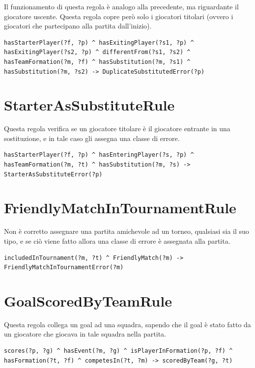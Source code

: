 \documentclass[11pt]{report} %
\begin{document}
Il funzionamento di questa regola è analogo alla precedente, ma riguardante il giocatore uscente.
Questa regola copre però solo i giocatori titolari (ovvero i giocatori che partecipano alla partita dall'inizio).

\begin{lstlisting}[language=SWRL]
hasStarterPlayer(?f, ?p) ^ hasExitingPlayer(?s1, ?p) ^ hasExitingPlayer(?s2, ?p) ^ differentFrom(?s1, ?s2) ^ hasTeamFormation(?m, ?f) ^ hasSubstitution(?m, ?s1) ^ hasSubstitution(?m, ?s2) -> DuplicateSubstitutedError(?p)
\end{lstlisting}

\section{StarterAsSubstituteRule}

Questa regola verifica se un giocatore titolare è il giocatore entrante in una sostituzione, e in tale caso gli assegna una classe di errore.

\begin{lstlisting}[language=SWRL]
hasStarterPlayer(?f, ?p) ^ hasEnteringPlayer(?s, ?p) ^ hasTeamFormation(?m, ?t) ^ hasSubstitution(?m, ?s) -> StarterAsSubstituteError(?p)
\end{lstlisting}

\section{FriendlyMatchInTournamentRule}

Non è corretto assegnare una partita amichevole ad un torneo, qualsiasi sia il suo tipo, e se ciò viene fatto allora una classe di errore è assegnata alla partita. 

\begin{lstlisting}[language=SWRL]
includedInTournament(?m, ?t) ^ FriendlyMatch(?m) -> FriendlyMatchInTournamentError(?m)
\end{lstlisting}

\section{GoalScoredByTeamRule}

Questa regola collega un goal ad una squadra, sapendo che il goal è stato fatto da un giocatore che giocava in tale squadra nella partita.

\begin{lstlisting}[language=SWRL]
scores(?p, ?g) ^ hasEvent(?m, ?g) ^ isPlayerInFormation(?p, ?f) ^ hasFormation(?t, ?f) ^ competesIn(?t, ?m) -> scoredByTeam(?g, ?t)
\end{lstlisting}
\end{document}
